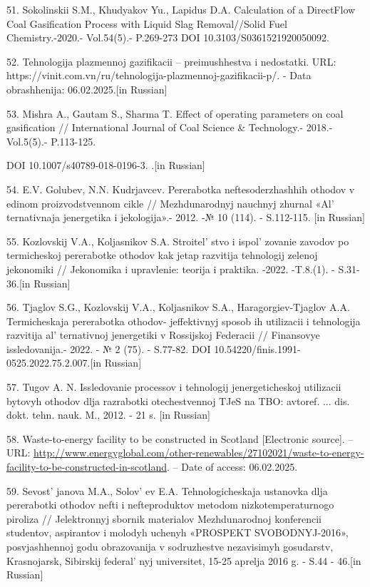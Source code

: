 \begin{references}
51. Sokolinskii S.M., Khudyakov Yu., Lapidus D.A. Calculation of a
DirectFlow Coal Gasification Process with Liquid Slag Removal//Solid
Fuel Chemistry.-2020.- Vol.54(5).- P.269-273 DOI
10.3103/S0361521920050092.

52. Tehnologija plazmennoj gazifikacii -- preimushhestva i nedostatki.
URL: https://vinit.com.vn/ru/tehnologija-plazmennoj-gazifikacii-p/. -
Data obrashhenija: 06.02.2025.{[}in Russian{]}

53. Mishra A., Gautam S., Sharma T. Effect of operating parameters on
coal gasification // International Journal of Coal Science \&
Technology.- 2018.- Vol.5(5).- P.113-125.

DOI 10.1007/s40789-018-0196-3. .{[}in Russian{]}

54. E.V. Golubev, N.N. Kudrjavcev. Pererabotka neftesoderzhashhih
othodov v edinom proizvodstvennom cikle // Mezhdunarodnyj nauchnyj
zhurnal «Al' ternativnaja jenergetika i jekologija».-
2012. -№ 10 (114). - S.112-115. {[}in Russian{]}

55. Kozlovskij V.A., Koljasnikov S.A. Stroitel' stvo i
ispol' zovanie zavodov po termicheskoj pererabotke
othodov kak jetap razvitija tehnologij zelenoj jekonomiki // Jekonomika
i upravlenie: teorija i praktika. -2022. -T.8.(1). - S.31-36.{[}in
Russian{]}

56. Tjaglov S.G., Kozlovskij V.A., Koljasnikov S.A., Haragorgiev-Tjaglov
A.A. Termicheskaja pererabotka othodov- jeffektivnyj sposob ih
utilizacii i tehnologija razvitija al' ternativnoj
jenergetiki v Rossijskoj Federacii // Finansovye issledovanija.- 2022. -
№ 2 (75). - S.77-82. DOI 10.54220/finis.1991-0525.2022.75.2.007.{[}in
Russian{]}

57. Tugov A. N. Issledovanie processov i tehnologij jenergeticheskoj
utilizacii bytovyh othodov dlja razrabotki otechestvennoj TJeS na TBO:
avtoref. ... dis. dokt. tehn. nauk. M., 2012. - 21 s. {[}in Russian{]}

58. Waste-to-energy facility to be constructed in Scotland {[}Electronic
source{]}. -- URL:
\url{http://www.energyglobal.com/other-renewables/27102021/waste-to-energy-facility-to-be-constructed-in-scotland}.
-- Date of access: 06.02.2025.

59. Sevost' janova M.A., Solov' ev E.A.
Tehnologicheskaja ustanovka dlja pererabotki othodov nefti i
nefteproduktov metodom nizkotemperaturnogo piroliza // Jelektronnyj
sbornik materialov Mezhdunarodnoj konferencii studentov, aspirantov i
molodyh uchenyh «PROSPEKT SVOBODNYJ-2016», posvjashhennoj godu
obrazovanija v sodruzhestve nezavisimyh gosudarstv, Krasnojarsk,
Sibirskij federal' nyj universitet, 15-25 aprelja 2016 g.
- S.44 - 46.{[}in Russian{]}


\end{references}
